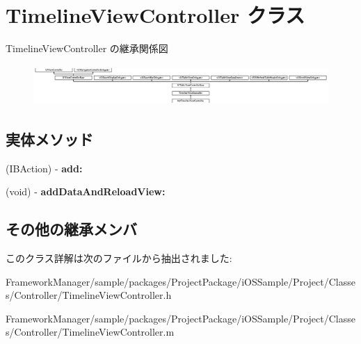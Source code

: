 \hypertarget{interface_timeline_view_controller}{}\section{Timeline\+View\+Controller クラス}
\label{interface_timeline_view_controller}
Timeline\+View\+Controller の継承関係図\begin{figure}[H]
\begin{center}
\leavevmode
\includegraphics[height=1.535088cm]{interface_timeline_view_controller}
\end{center}
\end{figure}
\subsection*{実体メソッド}
\begin{DoxyCompactItemize}
\item 
\hypertarget{interface_timeline_view_controller_a6368b3876891108cb69f698be66381a0}{}(I\+B\+Action) -\/ {\bfseries add\+:}\label{interface_timeline_view_controller_a6368b3876891108cb69f698be66381a0}

\item 
\hypertarget{interface_timeline_view_controller_a7cb219bcf71ff634e39e3d35919e8341}{}(void) -\/ {\bfseries add\+Data\+And\+Reload\+View\+:}\label{interface_timeline_view_controller_a7cb219bcf71ff634e39e3d35919e8341}

\end{DoxyCompactItemize}
\subsection*{その他の継承メンバ}


このクラス詳解は次のファイルから抽出されました\+:\begin{DoxyCompactItemize}
\item 
Framework\+Manager/sample/packages/\+Project\+Package/i\+O\+S\+Sample/\+Project/\+Classes/\+Controller/Timeline\+View\+Controller.\+h\item 
Framework\+Manager/sample/packages/\+Project\+Package/i\+O\+S\+Sample/\+Project/\+Classes/\+Controller/Timeline\+View\+Controller.\+m\end{DoxyCompactItemize}
